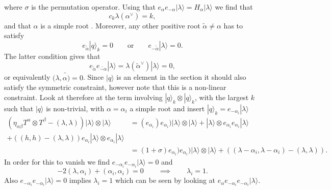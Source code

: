 where $\sigma$ is the permutation operator. Using that $e_{\alpha}e_{-\alpha}|\lambda\rangle = H_\alpha |\lambda\rangle$ we find that 
\begin{equation}
    c_k \lambda(\alpha^\vee) = k,
\end{equation}
and that $\alpha$ is a simple root . Moreover, any other positive root $\tilde{\alpha}\neq\alpha$ has to satisfy 
\begin{equation}
    e_{\tilde{\alpha}}|q\rangle_k = 0\qquad \text{or}\qquad e_{-\tilde{\alpha}}|\lambda\rangle = 0. 
\end{equation}
The latter condition gives that 
\begin{equation}
    e_{\tilde{\alpha}}e_{\tilde{-\alpha}}|\lambda\rangle = \lambda(\tilde{\alpha}^\vee)|\lambda\rangle=0,
\end{equation}
or equivalently $(\lambda,\tilde{\alpha)}=0$. Since $|q\rangle$ is an element in the section it should also satisfy the symmetric constraint, however note that this is a non-linear constraint. Look at therefore at the term involving $|q\rangle_k\otimes|q\rangle_k$, with the largest $k$ such that $|q\rangle$ is non-trivial, with $\alpha=\alpha_i$ a simple root and insert $|q\rangle_k=e_{-\alpha_i}|\lambda\rangle$
\begin{equation}
    \begin{aligned}
    \left(\eta_{\alpha\beta}T^\alpha\otimes T^\beta-(\lambda,\lambda)\right)|\lambda\rangle\otimes|\lambda\rangle &= (e_{\alpha_i})e_{\alpha_i})|\lambda\rangle\otimes|\lambda\rangle+|\lambda\rangle\otimes e_{\alpha_i}e_{\alpha_i}|\lambda\rangle\\
    +\left((h,h)-(\lambda,\lambda)\right)e_{\alpha_i}|\lambda\rangle\otimes e_{\alpha_i}|\lambda\rangle\\
    &= (1+\sigma)e_{\alpha_i})e_{\alpha_i})|\lambda\rangle\otimes|\lambda\rangle+\left((\lambda-\alpha_i,\lambda-\alpha_i)-(\lambda,\lambda)\right).
    \end{aligned}
\end{equation}
In order for this to vanish we find $e_{-\alpha_i}e_{-\alpha_i}|\lambda\rangle =0$ and 
\begin{equation}
    -2(\lambda,\alpha_i)+(\alpha_i,\alpha_i)=0\qquad \implies\qquad \lambda_i = 1.
\end{equation}
Also $e_{-\alpha_i}e_{-\alpha_i}|\lambda\rangle =0$ implies $\lambda_i=1$ which can be seen by looking at $e_{\alpha}e_{-\alpha_i}e_{-\alpha_i}|\lambda\rangle$. 

